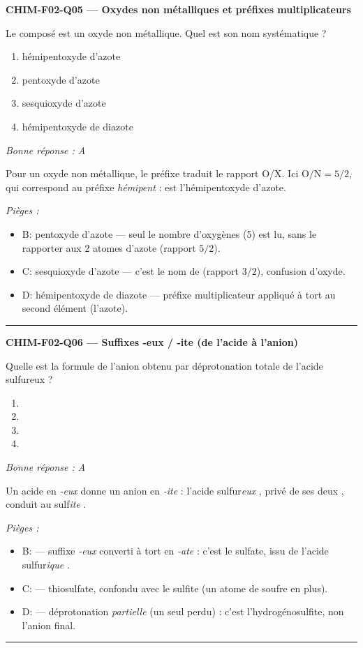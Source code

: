 \documentclass[11pt,a4paper]{article}
\begin{document}
\noindent\textbf{CHIM-F02-Q05 --- Oxydes non métalliques et préfixes multiplicateurs}\par
Le composé  est un oxyde non métallique. Quel est son nom systématique ?
\begin{enumerate}[label=\Alph*)]
\item hémipentoxyde d'azote
\item pentoxyde d'azote
\item sesquioxyde d'azote
\item hémipentoxyde de diazote
\end{enumerate}
\textit{Bonne réponse : A}\par
Pour un oxyde non métallique, le préfixe traduit le rapport O/X. Ici $\mathrm{O}/\mathrm{N} = 5/2$, qui correspond au préfixe \emph{hémipent} :  est l'hémipentoxyde d'azote.\par
\textit{Pièges :}
\begin{itemize}
\item B: pentoxyde d'azote --- seul le nombre d'oxygènes (5) est lu, sans le rapporter aux 2 atomes d'azote (rapport $5/2$).
\item C: sesquioxyde d'azote --- c'est le nom de  (rapport $3/2$), confusion d'oxyde.
\item D: hémipentoxyde de diazote --- préfixe multiplicateur appliqué à tort au second élément (l'azote).
\end{itemize}
\vspace{8pt}\hrule\vspace{8pt}

\noindent\textbf{CHIM-F02-Q06 --- Suffixes -eux / -ite (de l'acide à l'anion)}\par
Quelle est la formule de l'anion obtenu par déprotonation totale de l'acide sulfureux  ?
\begin{enumerate}[label=\Alph*)]
\item {}
\item {}
\item {}
\item {}
\end{enumerate}
\textit{Bonne réponse : A}\par
Un acide en \emph{-eux} donne un anion en \emph{-ite} : l'acide sulfur\emph{eux} , privé de ses deux , conduit au sulf\emph{ite} .\par
\textit{Pièges :}
\begin{itemize}
\item B:  --- suffixe \emph{-eux} converti à tort en \emph{-ate} : c'est le sulfate, issu de l'acide sulfur\emph{ique} .
\item C:  --- thiosulfate, confondu avec le sulfite (un atome de soufre en plus).
\item D:  --- déprotonation \emph{partielle} (un seul  perdu) : c'est l'hydrogénosulfite, non l'anion final.
\end{itemize}
\vspace{8pt}\hrule\vspace{8pt}
\end{document}
